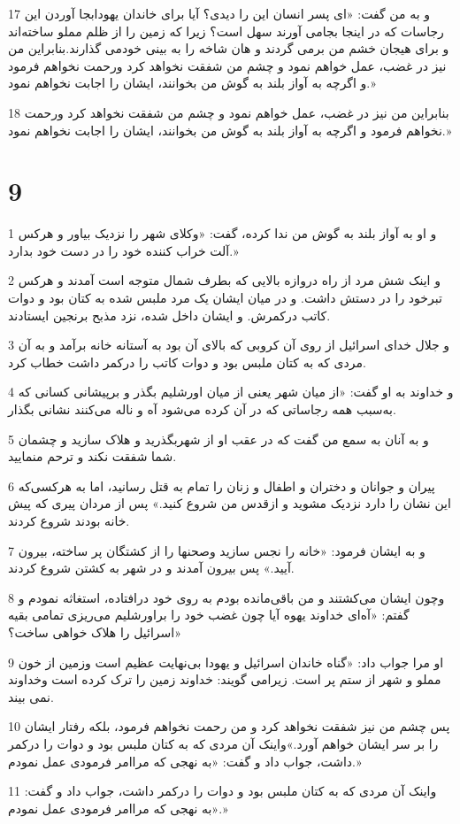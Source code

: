 \par 17 و به من گفت: «ای پسر انسان این را دیدی؟ آیا برای خاندان یهودابجا آوردن این رجاسات که در اینجا بجامی آورند سهل است؟ زیرا که زمین را از ظلم مملو ساخته‌اند و برای هیجان خشم من برمی گردند و هان شاخه را به بینی خودمی گذارند.بنابراین من نیز در غضب، عمل خواهم نمود و چشم من شفقت نخواهد کرد ورحمت نخواهم فرمود و اگرچه به آواز بلند به گوش من بخوانند، ایشان را اجابت نخواهم نمود.»
\par 18 بنابراین من نیز در غضب، عمل خواهم نمود و چشم من شفقت نخواهد کرد ورحمت نخواهم فرمود و اگرچه به آواز بلند به گوش من بخوانند، ایشان را اجابت نخواهم نمود.»

\chapter{9}

\par 1 و او به آواز بلند به گوش من ندا کرده، گفت: «وکلای شهر را نزدیک بیاور و هرکس آلت خراب کننده خود را در دست خود بدارد.»
\par 2 و اینک شش مرد از راه دروازه بالایی که بطرف شمال متوجه است آمدند و هرکس تبرخود را در دستش داشت. و در میان ایشان یک مرد ملبس شده به کتان بود و دوات کاتب درکمرش. و ایشان داخل شده، نزد مذبح برنجین ایستادند.
\par 3 و جلال خدای اسرائیل از روی آن کروبی که بالای آن بود به آستانه خانه برآمد و به آن مردی که به کتان ملبس بود و دوات کاتب را درکمر داشت خطاب کرد.
\par 4 و خداوند به او گفت: «از میان شهر یعنی از میان اورشلیم بگذر و برپیشانی کسانی که به‌سبب همه رجاساتی که در آن کرده می‌شود آه و ناله می‌کنند نشانی بگذار.
\par 5 و به آنان به سمع من گفت که در عقب او از شهربگذرید و هلاک سازید و چشمان شما شفقت نکند و ترحم منمایید.
\par 6 پیران و جوانان و دختران و اطفال و زنان را تمام به قتل رسانید، اما به هرکسی‌که این نشان را دارد نزدیک مشوید و ازقدس من شروع کنید.» پس از مردان پیری که پیش خانه بودند شروع کردند.
\par 7 و به ایشان فرمود: «خانه را نجس سازید وصحنها را از کشتگان پر ساخته، بیرون آیید.» پس بیرون آمدند و در شهر به کشتن شروع کردند.
\par 8 وچون ایشان می‌کشتند و من باقی‌مانده بودم به روی خود در‌افتاده، استغاثه نمودم و گفتم: «آه‌ای خداوند یهوه آیا چون غضب خود را براورشلیم می‌ریزی تمامی بقیه اسرائیل را هلاک خواهی ساخت؟»
\par 9 او مرا جواب داد: «گناه خاندان اسرائیل و یهودا بی‌نهایت عظیم است وزمین از خون مملو و شهر از ستم پر است. زیرامی گویند: خداوند زمین را ترک کرده است وخداوند نمی بیند.
\par 10 پس چشم من نیز شفقت نخواهد کرد و من رحمت نخواهم فرمود، بلکه رفتار ایشان را بر سر ایشان خواهم آورد.»واینک آن مردی که به کتان ملبس بود و دوات را درکمر داشت، جواب داد و گفت: «به نهجی که مراامر فرمودی عمل نمودم.»
\par 11 واینک آن مردی که به کتان ملبس بود و دوات را درکمر داشت، جواب داد و گفت: «به نهجی که مراامر فرمودی عمل نمودم.»

